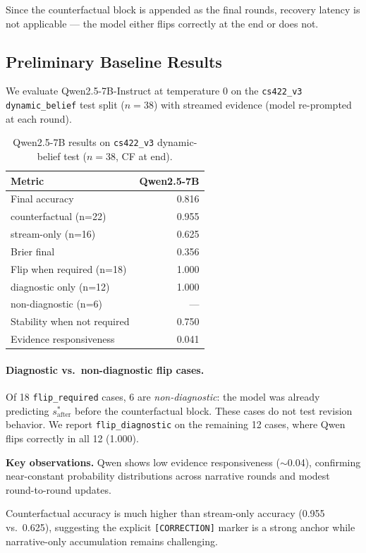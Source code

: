\documentclass{article}
\begin{document}
Since the counterfactual block is appended as the final rounds, recovery latency is not applicable --- the model either flips correctly at the end or does not.

\subsection{Preliminary Baseline Results}
We evaluate Qwen2.5-7B-Instruct at temperature 0 on the \texttt{cs422\_v3} \texttt{dynamic\_belief} test split (\(n=38\)) with streamed evidence (model re-prompted at each round).

\begin{table}[h]
\centering
\caption{Qwen2.5-7B results on \texttt{cs422\_v3} dynamic-belief test (\(n=38\), CF at end).}
\begin{tabular}{lr}
\toprule
Metric & Qwen2.5-7B \\
\midrule
Final accuracy & 0.816 \\
\quad counterfactual (n=22) & 0.955 \\
\quad stream-only (n=16) & 0.625 \\
Brier final & 0.356 \\
Flip when required (n=18) & 1.000 \\
\quad diagnostic only (n=12) & 1.000 \\
\quad non-diagnostic (n=6) & --- \\
Stability when not required & 0.750 \\
Evidence responsiveness & 0.041 \\
\bottomrule
\end{tabular}
\end{table}

\paragraph{Diagnostic vs.\ non-diagnostic flip cases.}
Of 18 \texttt{flip\_required} cases, 6 are \emph{non-diagnostic}: the model was already predicting \(s^*_{\text{after}}\) before the counterfactual block. These cases do not test revision behavior. We report \texttt{flip\_diagnostic} on the remaining 12 cases, where Qwen flips correctly in all 12 (1.000).

\textbf{Key observations.}
Qwen shows low evidence responsiveness ($\sim$0.04), confirming near-constant probability distributions across narrative rounds and modest round-to-round updates.

Counterfactual accuracy is much higher than stream-only accuracy (0.955 vs.\ 0.625), suggesting the explicit \texttt{[CORRECTION]} marker is a strong anchor while narrative-only accumulation remains challenging.
\end{document}
